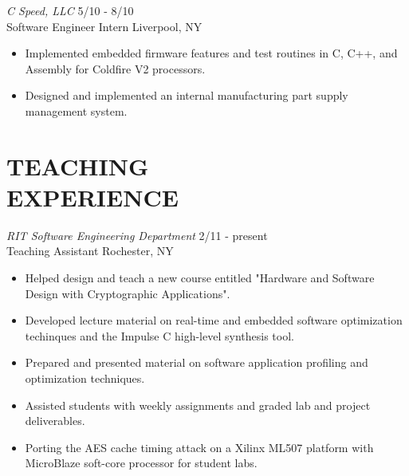 \documentclass[line,margin]{res}
\begin{document}
\begin{resume}

	  {\sl C Speed, LLC} \hfill   5/10 - 8/10\\
                Software Engineer Intern \hfill Liverpool, NY
                 \begin{itemize}  \itemsep -2pt %
                 \item Implemented embedded firmware features and test routines in C, C++, and Assembly for Coldfire V2 processors.
		\item Designed and implemented an internal manufacturing part supply management system.
                 \end{itemize} 

\section{TEACHING \\EXPERIENCE}
	{\sl RIT Software Engineering Department} \hfill   2/11 - present\\
                Teaching Assistant \hfill Rochester, NY
                 \begin{itemize}  \itemsep -2pt %
                 \item Helped design and teach a new course entitled "Hardware and Software Design with Cryptographic Applications".
		\item Developed lecture material on real-time and embedded software optimization techinques and the Impulse C high-level synthesis tool.
		\item Prepared and presented material on software application profiling and optimization techniques.
		\item Assisted students with weekly assignments and graded lab and project deliverables.
		\item Porting the AES cache timing attack on a Xilinx ML507 platform with MicroBlaze soft-core processor for student labs.
                 \end{itemize} 


\end{resume}
\end{document}
